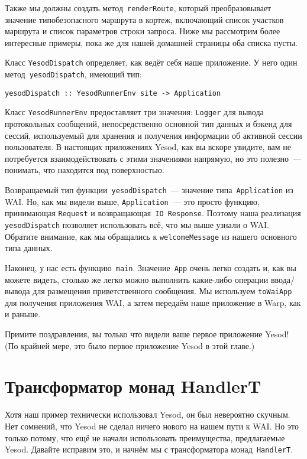 Также мы должны создать метод~\lstinline'renderRoute', который преобразовывает
значение типобезопасного маршрута в кортеж, включающий список участков маршрута
и список параметров строки запроса. Ниже мы рассмотрим более интересные
примеры, пока же для нашей домашней страницы оба списка пусты.

Класс \lstinline'YesodDispatch' определяет, как ведёт себя наше приложение. У
него один метод~\lstinline'yesodDispatch', имеющий тип:
\begin{lstlisting}
yesodDispatch :: YesodRunnerEnv site -> Application
\end{lstlisting}

Класс \lstinline'YesodRunnerEnv' предоставляет три значения: \lstinline'Logger'
для вывода протокольных сообщений, непосредственно основной тип данных и бэкенд
для сессий, используемый для хранения и получения информации об активной сессии
пользователя. В настоящих приложениях Yesod, как вы вскоре увидите, вам не
потребуется взаимодействовать с этими значениями напрямую, но это полезно~---
понимать, что находится под поверхностью.

Возвращаемый тип функции~\lstinline'yesodDispatch'~--- значение
типа~\lstinline'Application' из WAI. Но, как мы видели выше,
\lstinline'Application'~--- это просто функцию, принимающая \lstinline'Request'
и возвращающая~\lstinline'IO Response'. Поэтому наша реализация
\lstinline'yesodDispatch' позволяет использовать всё, что мы выше узнали о WAI.
Обратите внимание, как мы обращались к \lstinline'welcomeMessage' из нашего
основного типа данных.

Наконец, у нас есть функцию~\lstinline'main'. Значение~\lstinline'App' очень
легко создать и, как вы можете видеть, столько же легко можно выполнить
какие-либо операции ввода/вывода для размещения приветственного сообщения. Мы
используем \lstinline'toWaiApp' для получения приложения WAI, а затем передаём
наше приложение в Warp, как и раньше.

Примите поздравления, вы только что видели ваше первое приложение Yesod! (По
крайней мере, это было первое приложение Yesod в этой главе.)

\section{Трансформатор монад HandlerT}
Хотя наш пример технически использовал Yesod, он был невероятно скучным. Нет
сомнений, что Yesod не сделал ничего нового на нашем пути к WAI. Но это только
потому, что ещё не начали использовать преимущества, предлагаемые Yesod.
Давайте исправим это, и начнём мы с трансформатора монад~\lstinline'HandlerT'.

